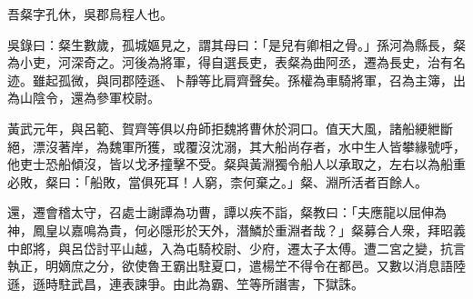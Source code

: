 
\begin{pinyinscope}
吾粲字孔休，吳郡烏程人也。

吳錄曰：粲生數歲，孤城嫗見之，謂其母曰：「是兒有卿相之骨。」孫河為縣長，粲為小吏，河深奇之。河後為將軍，得自選長吏，表粲為曲阿丞，遷為長史，治有名迹。雖起孤微，與同郡陸遜、卜靜等比肩齊聲矣。孫權為車騎將軍，召為主簿，出為山陰令，還為參軍校尉。

黃武元年，與呂範、賀齊等俱以舟師拒魏將曹休於洞口。值天大風，諸船綆紲斷絕，漂沒著岸，為魏軍所獲，或覆沒沈溺，其大船尚存者，水中生人皆攀緣號呼，他吏士恐船傾沒，皆以戈矛撞擊不受。粲與黃淵獨令船人以承取之，左右以為船重必敗，粲曰：「船敗，當俱死耳！人窮，柰何棄之。」粲、淵所活者百餘人。

還，遷會稽太守，召處士謝譚為功曹，譚以疾不詣，粲教曰：「夫應龍以屈伸為神，鳳皇以嘉鳴為貴，何必隱形於天外，潛鱗於重淵者哉？」粲募合人衆，拜昭義中郎將，與呂岱討平山越，入為屯騎校尉、少府，遷太子太傅。遭二宮之變，抗言執正，明嫡庶之分，欲使魯王霸出駐夏口，遣楊笁不得令在都邑。又數以消息語陸遜，遜時駐武昌，連表諫爭。由此為霸、笁等所譖害，下獄誅。


\end{pinyinscope}